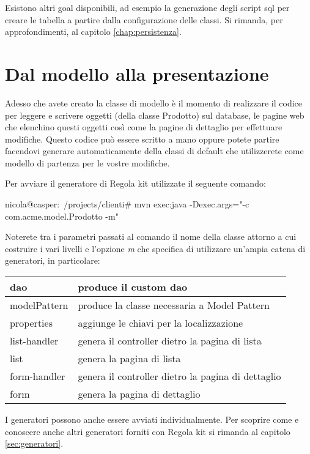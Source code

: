 \begin{nota}
Esistono altri goal disponibili, ad esempio la generazione degli script sql per creare le tabella a partire dalla configurazione delle classi. Si rimanda, per approfondimenti, al capitolo \vref{chap:persistenza}.
\end{nota}

\section{Dal modello alla presentazione}
Adesso che avete creato la classe di modello è il momento di realizzare il codice per leggere e scrivere oggetti (della classe Prodotto) sul database, le pagine web che elenchino questi oggetti così come la pagine di dettaglio per effettuare modifiche. Questo codice può essere scritto a mano oppure potete partire facendovi generare automaticamente della classi di default che utilizzerete come modello di partenza per le vostre modifiche.

Per avviare il generatore di Regola kit utilizzate il seguente comando:

\begin{bash}
nicola@casper:~/projects/clienti# mvn exec:java -Dexec.args="-c com.acme.model.Prodotto -m"
\end{bash}

Noterete tra i parametri passati al comando il nome della classe attorno a cui costruire i vari livelli e l'opzione \emph{m} che specifica di utilizzare un'ampia catena di generatori, in particolare:

\begin{center}
{
  \begin{tabular}{ | l | p{9cm} | }
  \hline
  dao &  produce il custom dao \\ \hline
  modelPattern & produce la classe necessaria a Model Pattern   \\ \hline
  properties & aggiunge le chiavi per la localizzazione \\ \hline
  list-handler & genera il controller dietro la pagina di lista \\ \hline
  list &  genera la pagina di lista\\ \hline
  form-handler & genera il controller dietro la pagina di dettaglio\\ \hline
  form &  genera la pagina di dettaglio \\ \hline
  \end{tabular}
}
\end{center}

\begin{nota}
I generatori possono anche essere avviati individualmente. Per scoprire come e conoscere anche altri generatori forniti con Regola kit si rimanda al capitolo \vref{sec:generatori}.
\end{nota}






